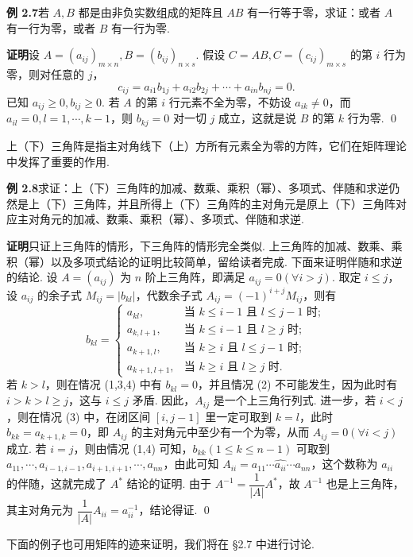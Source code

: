 \documentclass[UTF8,12pt,a4paper,fontset=fandol]{ctexart}
\begin{document}
\noindent\textbf{例 2.7}\quad 若 $A,B$ 都是由非负实数组成的矩阵且 $AB$ 有一行等于零，求证：或者 $A$ 有一行为零，或者 $B$ 有一行为零.

\noindent\textbf{证明}\quad 设 $A=(a_{ij})_{m\times n},B=(b_{ij})_{n\times s}$. 假设 $C=AB,C=(c_{ij})_{m\times s}$ 的第 $i$ 行为零，则对任意的 $j$，
\[
c_{ij}=a_{i1}b_{1j}+a_{i2}b_{2j}+\cdots+a_{in}b_{nj}=0.
\]
已知 $a_{ij}\ge0,b_{ij}\ge0$. 若 $A$ 的第 $i$ 行元素不全为零，不妨设 $a_{ik}\ne0$，而 $a_{il}=0,l=1,\cdots,k-1$，则 $b_{kj}=0$ 对一切 $j$ 成立，这就是说 $B$ 的第 $k$ 行为零. \qed

上（下）三角阵是指主对角线下（上）方所有元素全为零的方阵，它们在矩阵理论中发挥了重要的作用.

\noindent\textbf{例 2.8}\quad 求证：上（下）三角阵的加减、数乘、乘积（幂）、多项式、伴随和求逆仍然是上（下）三角阵，并且所得上（下）三角阵的主对角元是原上（下）三角阵对应主对角元的加减、数乘、乘积（幂）、多项式、伴随和求逆.

\noindent\textbf{证明}\quad 只证上三角阵的情形，下三角阵的情形完全类似. 上三角阵的加减、数乘、乘积（幂）以及多项式结论的证明比较简单，留给读者完成. 下面来证明伴随和求逆的结论. 设 $A=(a_{ij})$ 为 $n$ 阶上三角阵，即满足 $a_{ij}=0(\forall i>j)$. 取定 $i\le j$，设 $a_{ij}$ 的余子式 $M_{ij}=|b_{kl}|$，代数余子式 $A_{ij}=(-1)^{i+j}M_{ij}$，则有
\[
b_{kl}=
\begin{cases}
a_{kl}, & \text{当 } k\le i-1 \text{ 且 } l\le j-1 \text{ 时};\\
a_{k,l+1}, & \text{当 } k\le i-1 \text{ 且 } l\ge j \text{ 时};\\
a_{k+1,l}, & \text{当 } k\ge i \text{ 且 } l\le j-1 \text{ 时};\\
a_{k+1,l+1}, & \text{当 } k\ge i \text{ 且 } l\ge j \text{ 时}.
\end{cases}
\]
若 $k>l$，则在情况 (1,3,4) 中有 $b_{kl}=0$，并且情况 (2) 不可能发生，因为此时有 $i>k>l\ge j$，这与 $i\le j$ 矛盾. 因此，$A_{ij}$ 是一个上三角行列式. 进一步，若 $i<j$，则在情况 (3) 中，在闭区间 $[i,j-1]$ 里一定可取到 $k=l$，此时 $b_{kk}=a_{k+1,k}=0$，即 $A_{ij}$ 的主对角元中至少有一个为零，从而 $A_{ij}=0(\forall i<j)$ 成立. 若 $i=j$，则由情况 (1,4) 可知，$b_{kk}(1\le k\le n-1)$ 可取到 $a_{11},\cdots,a_{i-1,i-1},a_{i+1,i+1},\cdots,a_{nn}$，由此可知 $A_{ii}=a_{11}\cdots\widehat{a_{ii}}\cdots a_{nn}$，这个数称为 $a_{ii}$ 的伴随，这就完成了 $A^*$ 结论的证明. 由于 $A^{-1}=\dfrac1{|A|}A^*$，故 $A^{-1}$ 也是上三角阵，其主对角元为 $\dfrac1{|A|}A_{ii}=a_{ii}^{-1}$，结论得证. \qed

下面的例子也可用矩阵的迹来证明，我们将在 §2.7 中进行讨论.
\end{document}
